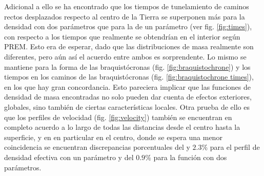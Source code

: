 \documentclass[aps,twocolumn,showpacs,preprintnumbers]{revtex4}
\begin{document}
    Adicional a ello se ha encontrado que los tiempos de tunelamiento de caminos rectos desplazados respecto al centro de la Tierra se superponen más para la densidad con dos parámetros que para la de un parámetro (ver fig. \ref{fig:times}), con respecto a los tiempos que realmente se obtendrían en el interior según PREM. Esto era de esperar, dado que las distribuciones de masa realmente son diferentes, pero aún así el acuerdo entre ambos es sorprendente. Lo mismo se mantiene para la forma de las braquistócronas (fig. \ref{fig:braquistochrone}) y los tiempos en los caminos de las braquistócronas (fig. \ref{fig:braquistochrone times}), en los que hay gran concordancia. Esto pareciera implicar que las funciones de densidad de masa encontradas no solo pueden dar cuenta de efectos exteriores, globales, sino también de ciertas características locales. Otra prueba de ello es que los perfiles de velocidad (fig. \ref{fig:velocity}) también se encuentran en completo acuerdo a lo largo de todas las distancias desde el centro hasta la superficie, y en en particular en el centro, donde se espera una menor coincidencia se encuentran discrepancias porcentuales del y $2.3\%$ para el perfil de densidad efectiva con un parámetro y del  $0.9\%$ para la función con dos parámetros.
    
\end{document}
